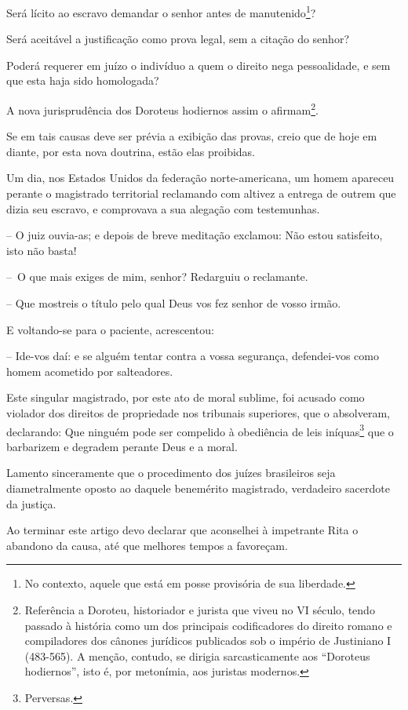Será lícito ao escravo demandar o senhor antes de manutenido\footnote{
  No contexto, aquele que está em posse provisória de sua liberdade.}?

Será aceitável a justificação como prova legal, sem a citação do senhor?

Poderá requerer em juízo o indivíduo a quem o direito nega pessoalidade,
e sem que esta haja sido homologada?

A nova jurisprudência dos Doroteus hodiernos assim o afirmam\footnote{
  Referência a Doroteu, historiador e jurista que viveu no VI século,
  tendo passado à história como um dos principais codificadores do
  direito romano e compiladores dos cânones jurídicos publicados sob o
  império de Justiniano I (483-565). A menção, contudo, se dirigia
  sarcasticamente aos ``Doroteus hodiernos'', isto é, por metonímia, aos
  juristas modernos.}.

Se em tais causas deve ser prévia a exibição das provas, creio que de
hoje em diante, por esta nova doutrina, estão elas proibidas.

Um dia, nos Estados Unidos da federação norte-americana, um homem
apareceu perante o magistrado territorial reclamando com altivez a
entrega de outrem que dizia seu escravo, e comprovava a sua alegação com
testemunhas.

-- O juiz ouvia-as; e depois de breve meditação exclamou: Não estou
satisfeito, isto não basta!

--~O que mais exiges de mim, senhor? Redarguiu o reclamante.

-- Que mostreis o título pelo qual Deus vos fez senhor de vosso irmão.

E voltando-se para o paciente, acrescentou:

-- Ide-vos daí: e se alguém tentar contra a vossa segurança,
defendei-vos como homem acometido por salteadores.

Este singular magistrado, por este ato de moral sublime, foi acusado
como violador dos direitos de propriedade nos tribunais superiores, que
o absolveram, declarando: Que ninguém pode ser compelido à obediência de
leis iníquas\footnote{Perversas.} que o barbarizem e degradem perante
Deus e a moral.

Lamento sinceramente que o procedimento dos juízes brasileiros seja
diametralmente oposto ao daquele benemérito magistrado, verdadeiro
sacerdote da justiça.

Ao terminar este artigo devo declarar que aconselhei à impetrante Rita o
abandono da causa, até que melhores tempos a favoreçam.

